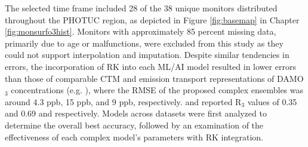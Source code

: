 The selected time frame included 28 of the 38 unique monitors distributed throughout the PHOTUC region, as depicted in Figure \ref{fig:basemap} in Chapter \ref{fig:monsurfo3hist}. Monitors with approximately 85 percent missing data, primarily due to age or malfunctions, were excluded from this study as they could not support interpolation and imputation. Despite similar tendencies in errors, the incorporation of RK into each ML/AI model resulted in lower errors than those of comparable CTM and emission transport representations of DAMO$_3$ concentrations (e.g. \cite{chattopadhyay_mlp_2019} \cite{pan_comparison_2023} \cite{zhang_recurrent_2022}), where the RMSE of the proposed complex ensembles was around 4.3 ppb, 15 ppb, and 9 ppb, respectively. \cite{chattopadhyay_mlp_2019} and \cite{zhang_recurrent_2022} reported R$_3$ values of 0.35 and 0.69 and respectively. Models across datasets were first analyzed to determine the overall best accuracy, followed by an examination of the effectiveness of each complex model's parameters with RK integration.

